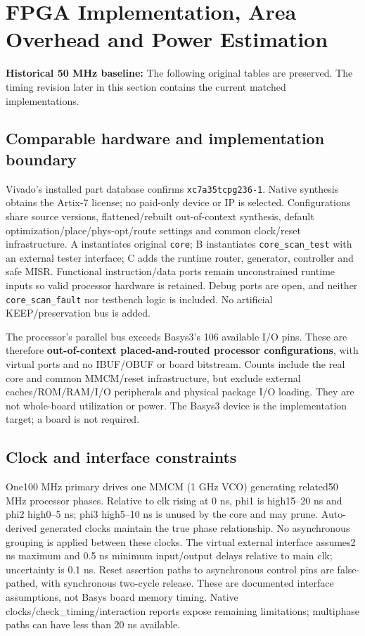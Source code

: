 \documentclass[11pt,a4paper]{article}
\begin{document}
\section{FPGA Implementation, Area Overhead and Power Estimation}


\textbf{Historical 50 MHz baseline:} The following original tables are preserved. The timing revision later in this section contains the current matched implementations.



\subsection{Comparable hardware and implementation boundary}


Vivado's installed part database confirms \texttt{xc7a35tcpg236-1}. Native synthesis obtains the Artix-7 license; no paid-only device or IP is selected. Configurations share source versions, flattened/rebuilt out-of-context synthesis, default optimization/place/phys-opt/route settings and common clock/reset infrastructure. A instantiates original \texttt{core}; B instantiates \texttt{core\_scan\_test} with an external tester interface; C adds the runtime router, generator, controller and safe MISR. Functional instruction/data ports remain unconstrained runtime inputs so valid processor hardware is retained. Debug ports are open, and neither \texttt{core\_scan\_fault} nor testbench logic is included. No artificial KEEP/preservation bus is added.



The processor's parallel bus exceeds Basys3's 106 available I/O pins. These are therefore \textbf{out-of-context placed-and-routed processor configurations}, with virtual ports and no IBUF/OBUF or board bitstream. Counts include the real core and common MMCM/reset infrastructure, but exclude external caches/ROM/RAM/I/O peripherals and physical package I/O loading. They are not whole-board utilization or power. The Basys3 device is the implementation target; a board is not required.



\subsection{Clock and interface constraints}


One100 MHz primary drives one MMCM (1 GHz VCO) generating related50 MHz processor phases. Relative to clk rising at 0 ns, phi1 is high15--20 ns and phi2 high0--5 ns; phi3 high5--10 ns is unused by the core and may prune. Auto-derived generated clocks maintain the true phase relationship. No asynchronous grouping is applied between these clocks. The virtual external interface assumes2 ns maximum and 0.5 ns minimum input/output delays relative to main clk; uncertainty is 0.1 ns. Reset assertion paths to asynchronous control pins are false-pathed, with synchronous two-cycle release. These are documented interface assumptions, not Basys board memory timing. Native clocks/check\_timing/interaction reports expose remaining limitations; multiphase paths can have less than 20 ns available.
\end{document}

